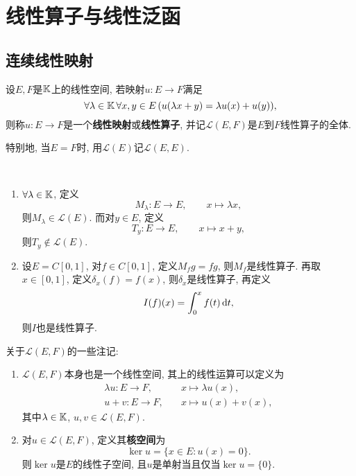 
\chapter{线性算子与线性泛函}

\section{连续线性映射}

	\begin{Definition}
	设$ E, F $是$ \mathbb{K} $上的线性空间, 若映射$ u : E\to F $满足
	\[
	\forall \lambda\in\mathbb{K}\,\forall x,y\in E\,(u(\lambda x+y)=\lambda u(x)+u(y)),
	\]
	则称$ u : E\to F $是一个\textbf{线性映射}或\textbf{线性算子}, 并记$ \mathcal L(E,F) $是$ E $到$ F $线性算子的全体.
	\end{Definition}
	
	特别地, 当$ E=F $时, 用$ \mathcal L(E) $记$ \mathcal{L}(E,E) $.
	
	\begin{Example}~
	\begin{enumerate}[(1)]
	\item $ \forall \lambda\in\mathbb{K} $, 定义
	\[
	M_\lambda : E\to E,\qquad x\mapsto\lambda x,
	\]
	则$ M_\lambda\in\mathcal L(E) $. 而对$ y\in E $, 定义
	\[
	T_y : E\to E,\qquad x\mapsto x+y,
	\]
	则$ T_y\notin\mathcal L(E) $.
	
	\item 设$ E=C[0,1] $, 对$ f\in C[0,1] $, 定义$ M_fg=fg $, 则$ M_f $是线性算子. 再取$ x\in[0,1] $, 定义$ \delta_x(f)=f(x) $, 则$ \delta_x $是线性算子, 再定义
	\[
	I(f)(x)=\int_0^xf(t)\,\mathrm{d} t,
	\]
	则$ I $也是线性算子.
	\end{enumerate}
	\end{Example}
	
	\begin{Remark}
	关于$ \mathcal L(E,F) $的一些注记:
	\begin{enumerate}[(1)]
	\item $ \mathcal L(E,F) $本身也是一个线性空间, 其上的线性运算可以定义为
	\[
		\begin{aligned}
			\lambda u : E\to F,& \quad x\mapsto\lambda u(x),\\
	u+v : E\to F,& \quad x\mapsto u(x)+v(x),
		\end{aligned}
	\]
	其中$ \lambda\in\mathbb{K} $, $ u, v\in\mathcal L(E,F) $.
	
	\item 对$ u\in\mathcal L(E,F) $, 定义其\textbf{核空间}为
	\[
	\ker u=\{ x\in E : u(x)=0 \}.
	\]
	则$ \ker u $是$ E $的线性子空间, 且$ u $是单射当且仅当$ \ker u=\{0\} $.
	\end{enumerate}
	\end{Remark}
	
